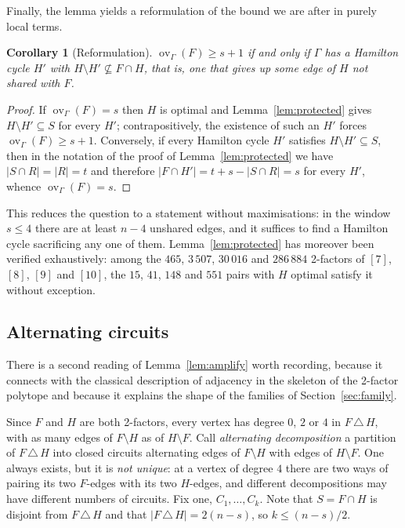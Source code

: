 \documentclass[11pt,a4paper]{article}
\newtheorem{corollary}[theorem]{Corollary}
\theoremstyle{definition}
\theoremstyle{remark}
\newcommand{\ov}{\operatorname{ov}}
\begin{document}
Finally, the lemma yields a reformulation of the bound we are after in purely local terms.

\begin{corollary}[Reformulation]\label{cor:reform}
$\ov_\Gamma(F)\ge s+1$ if and only if $\Gamma$ has a Hamilton cycle $H'$ with $H\setminus H'\not\subseteq F\cap H$, that is, one that gives up some edge of $H$ \emph{not} shared with $F$.
\end{corollary}

\begin{proof}
If $\ov_\Gamma(F)=s$ then $H$ is optimal and Lemma~\ref{lem:protected} gives $H\setminus H'\subseteq S$ for every $H'$; contrapositively, the existence of such an $H'$ forces $\ov_\Gamma(F)\ge s+1$. Conversely, if every Hamilton cycle $H'$ satisfies $H\setminus H'\subseteq S$, then in the notation of the proof of Lemma~\ref{lem:protected} we have $|S\cap R|=|R|=t$ and therefore $|F\cap H'|=t+s-|S\cap R|=s$ for every $H'$, whence $\ov_\Gamma(F)=s$.
\end{proof}

This reduces the question to a statement without maximisations: in the window $s\le4$ there are at least $n-4$ unshared edges, and it suffices to find a Hamilton cycle sacrificing any one of them. Lemma~\ref{lem:protected} has moreover been verified exhaustively: among the $465$, $3\,507$, $30\,016$ and $286\,884$ 2-factors of $[7]$, $[8]$, $[9]$ and $[10]$, the $15$, $41$, $148$ and $551$ pairs with $H$ optimal satisfy it without exception.

\subsection{Alternating circuits}\label{sub:alternating}

There is a second reading of Lemma~\ref{lem:amplify} worth recording, because it connects with the classical description of adjacency in the skeleton of the 2-factor polytope and because it explains the shape of the families of Section~\ref{sec:family}.

Since $F$ and $H$ are both 2-factors, every vertex has degree $0$, $2$ or $4$ in $F\,\triangle\,H$, with as many edges of $F\setminus H$ as of $H\setminus F$. Call \emph{alternating decomposition} a partition of $F\,\triangle\,H$ into closed circuits alternating edges of $F\setminus H$ with edges of $H\setminus F$. One always exists, but it is \emph{not unique}: at a vertex of degree $4$ there are two ways of pairing its two $F$-edges with its two $H$-edges, and different decompositions may have different numbers of circuits. Fix one, $C_1,\dots,C_k$. Note that $S=F\cap H$ is disjoint from $F\,\triangle\,H$ and that $|F\,\triangle\,H|=2(n-s)$, so $k\le (n-s)/2$.
\end{document}
